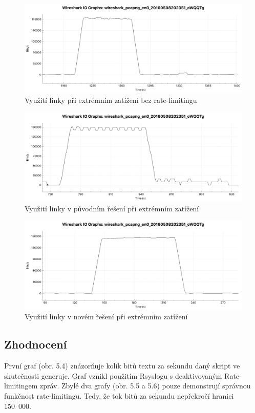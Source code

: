 \documentclass[thesis=B,czech]{FITthesis}[2012/06/26]
\begin{document}
\begin{figure}[H]
	\centering
	\includegraphics[scale=0.36]{images/test-rateLim-rsyslog-Buff-off}
	\caption[Využití linky při extrémním zatížení bez rate-limitingu]{Využití linky při extrémním zatížení bez rate-limitingu}
\end{figure}
\begin{figure}[H]
	\centering
	\includegraphics[scale=0.36]{images/test-rateLim-syslogd}
	\caption[Využití linky v původním řešení při extrémním zatížení]{Využití linky v původním řešení při extrémním zatížení}
\end{figure}
\begin{figure}[H]
	\centering
	\includegraphics[scale=0.36]{images/test-rateLim-rsyslog}
	\caption[Využití linky v novém řešení při extrémním zatížení]{Využití linky v novém řešení při extrémním zatížení}
\end{figure}

\subsection{Zhodnocení}
První graf (obr. 5.4) znázorňuje kolik bitů textu za sekundu daný skript ve skutečnosti generuje. Graf vznikl použitím Rsyslogu s deaktivovaným Rate-limitingem zpráv.
Zbylé dva grafy (obr. 5.5 a 5.6) pouze demonstrují správnou funkčnost rate-limitingu. Tedy, že tok bitů za sekundu nepřekročí hranici 150~000.
\end{document}
